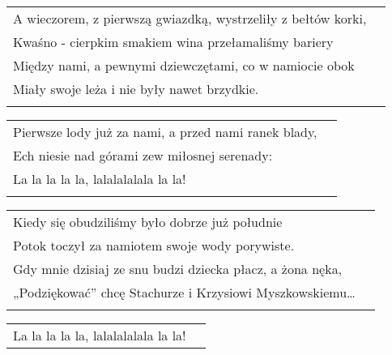 \documentclass[a5paper]{article}
\begin{document}
\noindent
\begin{tabular}{@{}p{10.30cm}p{3cm}@{}}
A wieczorem, z pierwszą gwiazdką, wystrzeliły z bełtów korki, \\
Kwaśno - cierpkim smakiem wina przełamaliśmy bariery \\
Między nami, a pewnymi dziewczętami, co w namiocie obok\\
Miały swoje leża i nie były nawet brzydkie. \\ \\
\end{tabular}

\noindent
\begin{tabular}{@{}p{10.30cm}p{3cm}@{}}
Pierwsze lody już za nami, a przed nami ranek blady, \\
Ech niesie nad górami zew miłosnej serenady: \\
La la la la la, lalalalalala la la! \\ \\
\end{tabular}

\noindent
\begin{tabular}{@{}p{10.30cm}p{3cm}@{}}
Kiedy się obudziliśmy było dobrze już południe \\
Potok toczył za namiotem swoje wody porywiste. \\
Gdy mnie dzisiaj ze snu budzi dziecka płacz, a żona nęka, \\
„Podziękować” chcę Stachurze i Krzysiowi Myszkowskiemu… \\ \\
\end{tabular}

\noindent
\begin{tabular}{@{}p{8.30cm}p{3cm}@{}}
La la la la la, lalalalalala la la!
\end{tabular}
\end{document}

